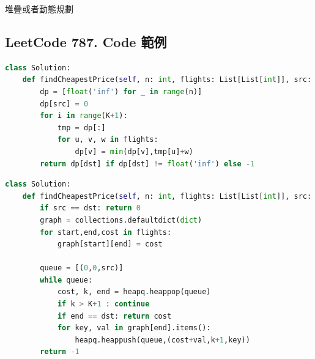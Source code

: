 \documentclass[10pt,UTF8]{ctexart}
\begin{document}
堆疊或者動態規劃

\subsection{LeetCode 787. Code 範例}

\begin{lstlisting}[language={python}]
class Solution:
    def findCheapestPrice(self, n: int, flights: List[List[int]], src: int, dst: int, K: int) -> int:
        dp = [float('inf') for _ in range(n)]
        dp[src] = 0
        for i in range(K+1):
            tmp = dp[:]
            for u, v, w in flights:
                dp[v] = min(dp[v],tmp[u]+w)
        return dp[dst] if dp[dst] != float('inf') else -1
\end{lstlisting}

\begin{lstlisting}[language={python}]
class Solution:
    def findCheapestPrice(self, n: int, flights: List[List[int]], src: int, dst: int, K: int) -> int:
        if src == dst: return 0
        graph = collections.defaultdict(dict)
        for start,end,cost in flights:
            graph[start][end] = cost

        queue = [(0,0,src)]
        while queue:
            cost, k, end = heapq.heappop(queue)
            if k > K+1 : continue
            if end == dst: return cost
            for key, val in graph[end].items():
                heapq.heappush(queue,(cost+val,k+1,key))
        return -1
\end{lstlisting}
\end{document}
